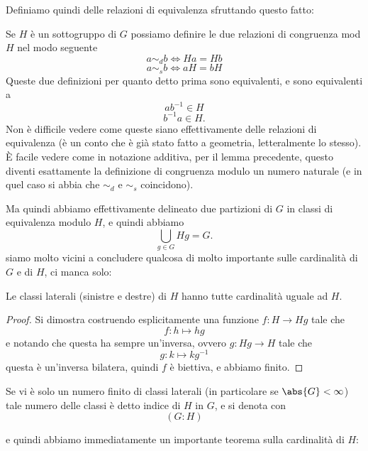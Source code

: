 \documentclass[11pt]{scrartcl}
\begin{document}
	Definiamo quindi delle relazioni di equivalenza sfruttando questo fatto:
	\begin{definition}
		Se $H$ è un sottogruppo di $G$ possiamo definire le due relazioni di congruenza mod $H$ nel modo seguente
		$$a\sim_d b \iff Ha=Hb$$
		$$a\sim_s b \iff aH=bH$$
		Queste due definizioni per quanto detto prima sono equivalenti, e sono equivalenti a
		$$ab^{-1}\in H$$ 
		$$b^{-1}a\in H.$$
		Non è difficile vedere come queste siano effettivamente delle relazioni di equivalenza (è un conto che è già stato fatto a geometria, letteralmente lo stesso).
		\`E facile vedere come in notazione additiva, per il lemma precedente, questo diventi esattamente la definizione di congruenza modulo un numero naturale (e in quel caso si abbia che $\sim_d$ e $\sim_s$ coincidono). 
	\end{definition}
	
	Ma quindi abbiamo effettivamente delineato due partizioni di $G$ in classi di equivalenza modulo $H$, e quindi abbiamo
	$$\bigcup_{g\in G} Hg=G.$$ 
	siamo molto vicini a concludere qualcosa di molto importante sulle cardinalità di $G$ e di $H$, ci manca solo:
	\begin{lemma}
		Le classi laterali (sinistre e destre) di $H$ hanno tutte cardinalità uguale ad $H$.
	\end{lemma}
	\begin{proof}
		Si dimostra costruendo esplicitamente una funzione $f:H\to Hg$ tale che
		$$f:h\mapsto hg$$
		e notando che questa ha sempre un'inversa, ovvero $g:Hg\to H$ tale che
		$$g:k\mapsto kg^{-1}$$
		questa è un'inversa bilatera, quindi $f$ è biettiva, e abbiamo finito.
	\end{proof}
	\begin{definition}
		Se vi è solo un numero finito di classi laterali (in particolare se $\abs{G}<\infty$) tale numero delle classi è detto indice di $H$ in $G$, e si denota con
		$$(G:H)$$
	\end{definition}
	
	e quindi abbiamo immediatamente un importante teorema sulla cardinalità di $H$:
	
\end{document}
